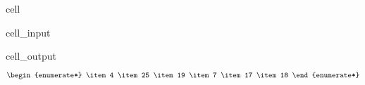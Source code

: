 \documentclass[letterpaper,10pt,english]{jupyterBook}
\begin{document}
\begin{sphinxuseclass}{cell}\begin{sphinxVerbatimInput}

\begin{sphinxuseclass}{cell_input}
\begin{sphinxVerbatim}[commandchars=\\\{\}]
\end{sphinxVerbatim}

\end{sphinxuseclass}\end{sphinxVerbatimInput}
\begin{sphinxVerbatimOutput}

\begin{sphinxuseclass}{cell_output}\begin{equation*}
\begin{split}\begin{enumerate*}
\item 4
\item 25
\item 19
\item 7
\item 17
\item 18
\end{enumerate*}\end{split}
\end{equation*}
\end{sphinxuseclass}\end{sphinxVerbatimOutput}

\end{sphinxuseclass}
\end{document}
